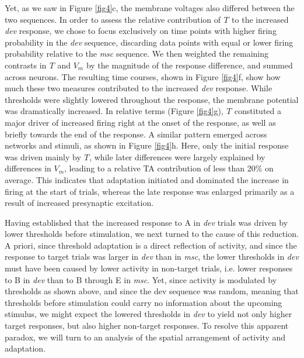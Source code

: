 \documentclass[pdflatex,referee,iicol,sn-basic]{sn-jnl}
\newcommand{\dev}{\textit{dev}}
\newcommand{\msc}{\textit{msc}}
\renewcommand{\T}[3][]{{}^{#1}_{}T^{#2}_{#3}}
\theoremstyle{thmstyleone}%
\theoremstyle{thmstyletwo}%
\theoremstyle{thmstylethree}%
\begin{document}
Yet, as we saw in Figure \ref{fig4}c, the membrane voltages also differed between the two sequences. In order to assess the relative contribution of $\T{}{}$ to the increased \dev{} response, we chose to focus exclusively on time points with higher firing probability in the \dev{} sequence, discarding data points with equal or lower firing probability relative to the \msc{} sequence. We then weighted the remaining contrasts in $\T{}{}$ and $V_m$ by the magnitude of the response difference, and summed across neurons. The resulting time courses, shown in Figure \ref{fig4}f, show how much these two measures contributed to the increased \dev{} response. While thresholds were slightly lowered throughout the response, the membrane potential was dramatically increased. In relative terms (Figure \ref{fig4}g), $\T{}{}$ constituted a major driver of increased firing right at the onset of the response, as well as briefly towards the end of the response. A similar pattern emerged across networks and stimuli, as shown in Figure \ref{fig4}h. Here, only the initial response was driven mainly by $\T{}{}$, while later differences were largely explained by differences in $V_m$, leading to a relative TA contribution of less than 20\% on average. This indicates that adaptation initiated and dominated the increase in firing at the start of trials, whereas the late response was enlarged primarily as a result of increased presynaptic excitation.

Having established that the increased response to A in \dev{} trials was driven by lower thresholds before stimulation, we next turned to the cause of this reduction. A priori, since threshold adaptation is a direct reflection of activity, and since the response to target trials was larger in \dev{} than in \msc{}, the lower thresholds in \dev{} must have been caused by lower activity in non-target trials, i.e. lower responses to B in \dev{} than to B through E in \msc{}. Yet, since activity is modulated by thresholds as shown above, and since the dev sequence was random, meaning that thresholds before stimulation could carry no information about the upcoming stimulus, we might expect the lowered thresholds in \dev{} to yield not only higher target responses, but also higher non-target responses. To resolve this apparent paradox, we will turn to an analysis of the spatial arrangement of activity and adaptation.
\end{document}
